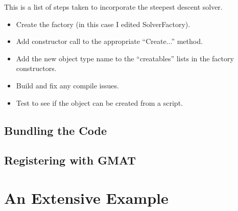 This is a list of steps taken to incorporate the steepest descent solver.

\begin{itemize}
\item Create the factory (in this case I edited SolverFactory).
\item Add constructor call to the appropriate ``Create...'' method.
\item Add the new object type name to the ``creatables'' lists in the factory constructors.
\item Build and fix any compile issues.
\item Test to see if the object can be created from a script.
\end{itemize}

\subsection{Bundling the Code}

\subsection{Registering with GMAT}

\section{An Extensive Example}
